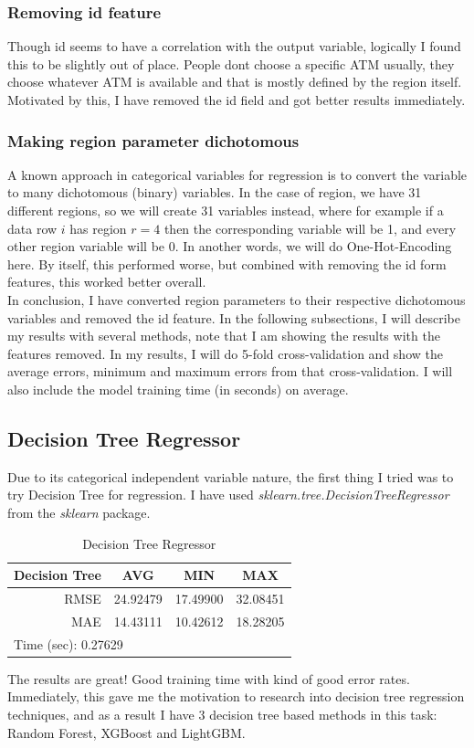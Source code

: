 \documentclass[11pt,reqno]{amsart}
\begin{document}
\subsubsection{Removing id feature}
Though id seems to have a correlation with the output variable, logically I found this to be slightly out of place. People dont choose a specific ATM usually, they choose whatever ATM is available and that is mostly defined by the region itself. Motivated by this, I have removed the id field and got better results immediately.
\subsubsection{Making region parameter dichotomous}
A known approach in categorical variables for regression is to convert the variable to many dichotomous (binary) variables. In the case of region, we have 31 different regions, so we will create 31 variables instead, where for example if a data row  $i$ has region $r=4$ then the corresponding variable will be 1, and every other region variable will be 0. In another words, we will do One-Hot-Encoding here. By itself, this performed worse, but combined with removing the id form features, this worked better overall. \\

In conclusion, I have converted region parameters to their respective dichotomous variables and removed the id feature. In the following subsections, I will describe my results with several methods, note that I am showing the results with the features removed. In my results, I will do 5-fold cross-validation and show the average errors, minimum and maximum errors from that cross-validation. I will also include the model training time (in seconds) on average.

\subsection{Decision Tree Regressor}
Due to its categorical independent variable nature, the first thing I tried was to try Decision Tree for regression. I have used \textit{sklearn.tree.DecisionTreeRegressor} from the \textit{sklearn} package. 
\begin{table}[]
\begin{tabular}{|c|l|l|l|}
\hline
Decision Tree & \multicolumn{1}{c|}{AVG} & \multicolumn{1}{c|}{MIN} & \multicolumn{1}{c|}{MAX} \\ \hline
\multicolumn{1}{|r|}{RMSE} & 24.92479 & 17.49900 & 32.08451 \\ \hline
\multicolumn{1}{|r|}{MAE} & 14.43111 & 10.42612 & 18.28205 \\ \hline
\multicolumn{4}{|l|}{Time (sec): 0.27629} \\ \hline
\end{tabular}
\caption{Decision Tree Regressor}
\label{tab:decisiontree}
\end{table}
The results are great! Good training time with kind of good error rates. Immediately, this gave me the motivation to research into decision tree regression techniques, and as a result I have 3 decision tree based methods in this task: Random Forest, XGBoost and LightGBM.
\end{document}
